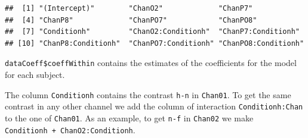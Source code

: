 \documentclass[
]{article}
\newenvironment{Shaded}{\begin{snugshade}}{\end{snugshade}}
\newcommand{\AttributeTok}[1]{\textcolor[rgb]{0.77,0.63,0.00}{#1}}
\newcommand{\ConstantTok}[1]{\textcolor[rgb]{0.00,0.00,0.00}{#1}}
\newcommand{\DecValTok}[1]{\textcolor[rgb]{0.00,0.00,0.81}{#1}}
\newcommand{\FunctionTok}[1]{\textcolor[rgb]{0.00,0.00,0.00}{#1}}
\newcommand{\NormalTok}[1]{#1}
\newcommand{\OtherTok}[1]{\textcolor[rgb]{0.56,0.35,0.01}{#1}}
\newcommand{\SpecialCharTok}[1]{\textcolor[rgb]{0.00,0.00,0.00}{#1}}
\newcommand{\StringTok}[1]{\textcolor[rgb]{0.31,0.60,0.02}{#1}}
\begin{document}
\begin{Shaded}
\end{Shaded}

\begin{verbatim}
##  [1] "(Intercept)"        "ChanO2"             "ChanP7"            
##  [4] "ChanP8"             "ChanPO7"            "ChanPO8"           
##  [7] "Conditionh"         "ChanO2:Conditionh"  "ChanP7:Conditionh" 
## [10] "ChanP8:Conditionh"  "ChanPO7:Conditionh" "ChanPO8:Conditionh"
\end{verbatim}

\texttt{dataCoeff\$coeffWithin} contains the estimates of the
coefficients for the model for each subject.

The column \texttt{Conditionh} contains the contrast \texttt{h-n} in
\texttt{Chan01}. To get the same contrast in any other channel we add
the column of interaction \texttt{Conditionh:Chan} to the one of
\texttt{Chan01}. As an example, to get \texttt{n-f} in \texttt{Chan02}
we make \texttt{Conditionh\ +\ ChanO2:Conditionh}.

\begin{Shaded}
\end{Shaded}
\end{document}

